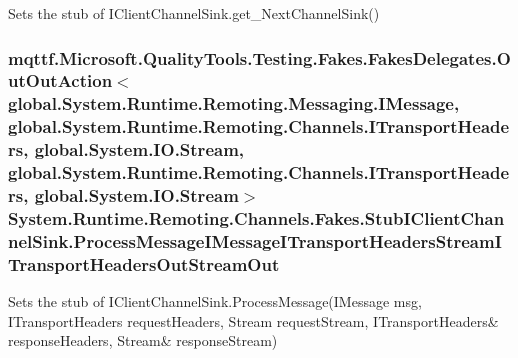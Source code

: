 Sets the stub of I\-Client\-Channel\-Sink.\-get\-\_\-\-Next\-Channel\-Sink()

\hypertarget{class_system_1_1_runtime_1_1_remoting_1_1_channels_1_1_fakes_1_1_stub_i_client_channel_sink_aad3ae4fe32ff5b64a16cc99d7510f80c}{
\subsubsection[{Process\-Message\-I\-Message\-I\-Transport\-Headers\-Stream\-I\-Transport\-Headers\-Out\-Stream\-Out}]{\setlength{\rightskip}{0pt plus 5cm}mqttf.\-Microsoft.\-Quality\-Tools.\-Testing.\-Fakes.\-Fakes\-Delegates.\-Out\-Out\-Action$<$global.\-System.\-Runtime.\-Remoting.\-Messaging.\-I\-Message, global.\-System.\-Runtime.\-Remoting.\-Channels.\-I\-Transport\-Headers, global.\-System.\-I\-O.\-Stream, global.\-System.\-Runtime.\-Remoting.\-Channels.\-I\-Transport\-Headers, global.\-System.\-I\-O.\-Stream$>$ System.\-Runtime.\-Remoting.\-Channels.\-Fakes.\-Stub\-I\-Client\-Channel\-Sink.\-Process\-Message\-I\-Message\-I\-Transport\-Headers\-Stream\-I\-Transport\-Headers\-Out\-Stream\-Out}}\label{class_system_1_1_runtime_1_1_remoting_1_1_channels_1_1_fakes_1_1_stub_i_client_channel_sink_aad3ae4fe32ff5b64a16cc99d7510f80c}


Sets the stub of I\-Client\-Channel\-Sink.\-Process\-Message(I\-Message msg, I\-Transport\-Headers request\-Headers, Stream request\-Stream, I\-Transport\-Headers\& response\-Headers, Stream\& response\-Stream)

